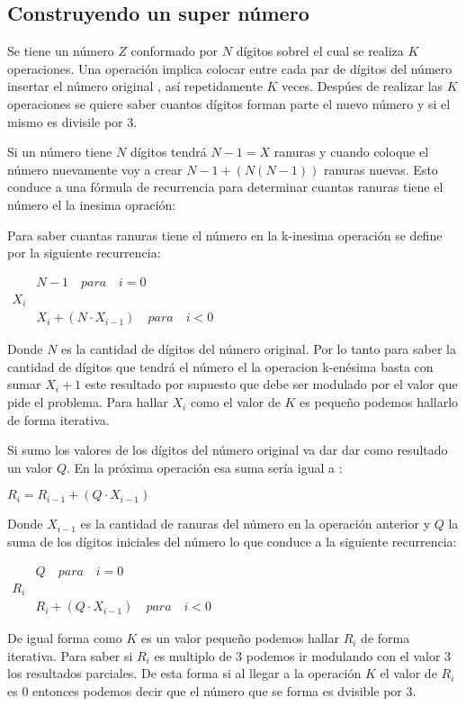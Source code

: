 \subsection{Construyendo un super número} Se tiene un número $Z$ conformado por $N$ dígitos sobrel el cual se realiza $K$ operaciones. Una operación implica colocar entre cada par de dígitos del número insertar el número original , así repetidamente $K$ veces. Despúes de realizar las $K$ operaciones se quiere saber cuantos dígitos forman parte el nuevo número y si el mismo es divisile por 3.

Si un número tiene $N$ dígitos tendrá $N-1=X$ ranuras y cuando coloque el número nuevamente voy a crear $N-1 +(N(N-1))$ ranuras nuevas. Esto conduce a una fórmula de recurrencia para determinar cuantas ranuras tiene el número el la inesima opración:

Para saber cuantas ranuras tiene el número en la k-inesima operación se define por la siguiente recurrencia:

$\begin{matrix}
	&     N-1 \quad para \quad i=0\\ 
	X_{i}	&  \\ 
	& X_{i}+(N \cdotp X_{i-1}) \quad para \quad i<0
\end{matrix}$ 

Donde $N$ es la cantidad de dígitos del número original. Por lo tanto para saber la cantidad de dígitos que tendrá el número el la operacion k-enésima basta con sumar $X_{i}+1$ este resultado por supuesto que debe ser modulado por el valor que pide el problema. Para hallar $X_{i}$ como el valor de $K$ es pequeño podemos hallarlo de forma iterativa.

Si sumo los valores de los dígitos del número original va dar dar como resultado un valor $Q$. En la próxima operación esa suma sería igual a :

$R_{i}=R_{i-1}+(Q \cdotp X_{i-1})$

Donde $X_{i-1}$ es la cantidad de ranuras del número en la operación anterior y $Q$ la suma de los dígitos iniciales del número lo que conduce a la siguiente recurrencia:

$\begin{matrix}
	&     Q \quad para \quad i=0\\ 
	R_{i}	&  \\ 
	& R_{i}+(Q \cdotp X_{i-1}) \quad para \quad i<0
\end{matrix}$ 

De igual forma como $K$ es un valor pequeño podemos hallar $R_{i}$ de forma iterativa. Para saber si $R_{i}$ es multiplo de 3 podemos ir modulando con el valor  3 los resultados parciales. De esta forma si al llegar a la operación $K$ el valor de $R_{i}$ es $0$ entonces podemos decir que el número que se forma es dvisible por 3. 

